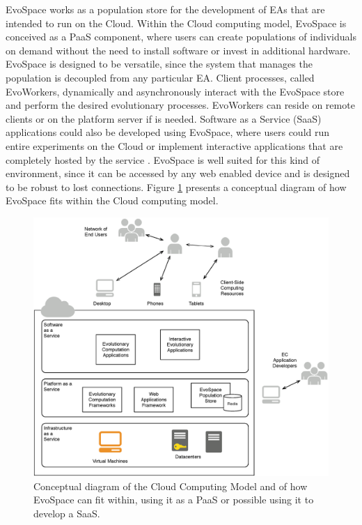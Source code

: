 EvoSpace works as a population store for the development of EAs that are intended to run on the Cloud.
Within the Cloud computing model, EvoSpace is conceived as a PaaS component, where users can create populations of individuals on demand
without the need to install software or invest in additional hardware.
EvoSpace is designed to be versatile, since the system that manages the population is decoupled from any particular EA.
Client processes, called EvoWorkers, dynamically and asynchronously interact with the EvoSpace store and perform the desired evolutionary processes.
EvoWorkers can reside on remote clients or on the platform server if is needed.
Software as a Service (SaaS) applications could also be developed using EvoSpace, where users could run entire experiments on the
Cloud or implement interactive applications that are completely hosted by the service \cite{cloud}.
EvoSpace is well suited for this kind of environment, since it can be accessed by any web enabled device and is designed to be robust to lost connections.
Figure \ref{fig:cloud} presents a conceptual diagram of how EvoSpace fits within the Cloud computing model.

\begin{figure}[t]
    \centering
        \includegraphics[width=12cm]{cloud2.eps}
    \caption{Conceptual diagram of the Cloud Computing Model and of how EvoSpace can fit within, using it as a PaaS or possible using it to develop a SaaS.}
    \label{fig:cloud}
\end{figure}


